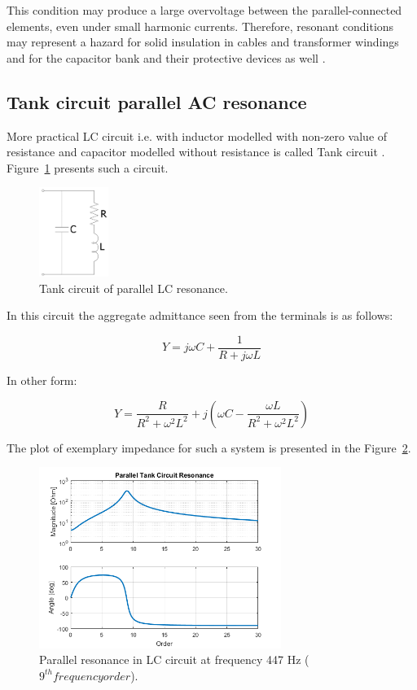 \documentclass[12pt]{report} %
\begin{document}
This condition may produce a large overvoltage between the parallel-connected elements, even under small harmonic currents. Therefore, resonant conditions may represent a hazard for solid insulation in cables and transformer windings and for the capacitor bank and their protective devices as well \cite{rosa}. 

\subsection{Tank circuit parallel AC resonance}
More practical LC circuit i.e. with inductor modelled with non-zero value of resistance and capacitor modelled without resistance is called Tank circuit \cite{das}. Figure~\ref{fig:tank} presents such a circuit.

\begin{figure}[htb]
	\centering
		\includegraphics[width=0.2\textwidth]{img/theory/tank_circ.PNG}
	\caption{Tank circuit of parallel LC resonance.}
	\label{fig:tank}
\end{figure}
\FloatBarrier

In this circuit the aggregate admittance seen from the terminals is as follows:

\begin{equation}
	Y=j\omega C+\dfrac{1}{R+j\omega L}
\end{equation}

In other form:

\begin{equation}
	Y=\dfrac{R}{R^2+\omega^2L^2}+j\left(\omega C-\dfrac{\omega L}{R^2+\omega^2L^2}\right)
\end{equation}

The plot of exemplary impedance for such a system is presented in the Figure~\ref{fig:tankresonance}.

\begin{figure}[htb]
	\centering
		\includegraphics[width=0.7\textwidth]{img/theory/tank_parallel_resonance_f447.png}
	\caption{Parallel resonance in LC circuit at frequency 447 Hz ($9^{th} frequency order$).}
	\label{fig:tankresonance}
\end{figure}
\FloatBarrier
\end{document}
